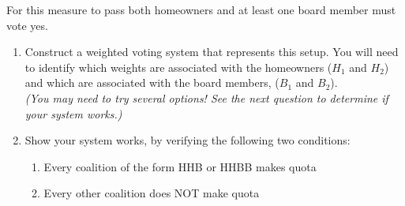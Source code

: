 \documentclass[12pt]{article}
\begin{document}
\begin{enumerate}
    For this measure to pass both homeowners and at least one board member must vote yes. %
    
    
	\begin{enumerate}
	\item Construct a weighted voting system that represents this setup. You will need to identify which weights are associated with the homeowners ($H_1$ and $H_2$) and which are associated with the board members, ($B_1$ and $B_2$).\\

 	\emph{(You may need to try several options! See the next question to determine if your system works.)}

\vfill


	\item Show your system works, by verifying the following two conditions:

		\begin{enumerate}
        		\item Every coalition of the form HHB  or HHBB makes quota
        		\vfill
        		\item Every other coalition does NOT make quota
        		\vfill
       		\end{enumerate}
	\end{enumerate}
\end{enumerate}
\end{document}

